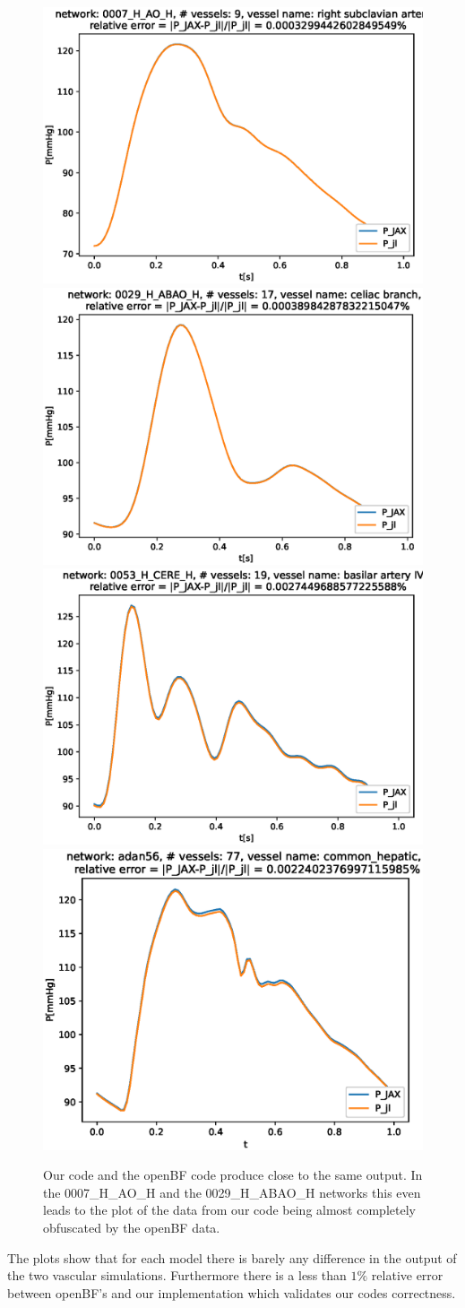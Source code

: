 \documentclass[a4paper, oneside]{discothesis}
\begin{document}
						\begin{figure} [H]
							\centering
							\includegraphics[width=0.4\columnwidth]{figures/0007_H_AO_H_right_subclavian_artery_P.eps}
							\includegraphics[width=0.4\columnwidth]{figures/0029_H_ABAO_H_celiac_branch_P.eps
							}
							\includegraphics[width=0.4\columnwidth]{figures/0053_H_CERE_H_basilar_artery_IV_P.eps}
							\includegraphics[width=0.4\columnwidth]{figures/adan56_common_hepatic_P.eps}
							\caption{Our code and the openBF code produce close to the same output. In the 0007\_H\_AO\_H and the 0029\_H\_ABAO\_H networks this even leads to the plot of the data from our code being almost completely obfuscated by the openBF data.}
							\label{fig:val}
\end{figure}
The plots show that for each model there is barely any difference in the output of the two vascular simulations.
Furthermore there is a less than $1\%$ relative error between openBF's and our implementation which validates our codes correctness.
\end{document}
